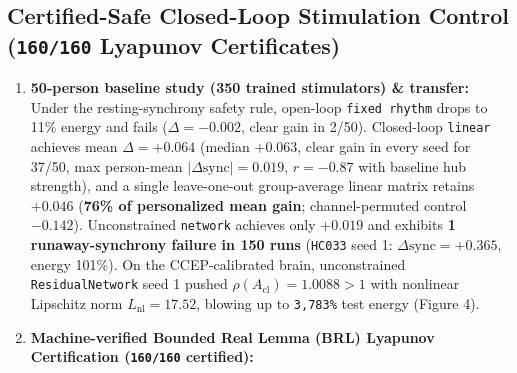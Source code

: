 \documentclass[11pt,a4paper]{article}
\begin{document}
\subsection{Certified-Safe Closed-Loop Stimulation Control (\texttt{160/160} Lyapunov Certificates)}
\begin{enumerate}
\item \textbf{50-person baseline study (350 trained stimulators) \& transfer:} Under the resting-synchrony safety rule, open-loop \texttt{fixed rhythm} drops to 11\% energy and fails ($\Delta = -0.002$, clear gain in 2/50). Closed-loop \texttt{linear} achieves mean $\Delta = +0.064$ (median $+0.063$, clear gain in every seed for 37/50, max person-mean $|\Delta\text{sync}| = 0.019$, $r = -0.87$ with baseline hub strength), and a single leave-one-out group-average linear matrix retains $+0.046$ (\textbf{76\% of personalized mean gain}; channel-permuted control $-0.142$). Unconstrained \texttt{network} achieves only $+0.019$ and exhibits \textbf{1 runaway-synchrony failure in 150 runs} (\texttt{HC033} seed 1: $\Delta\text{sync} = +0.365$, energy 101\%). On the CCEP-calibrated brain, unconstrained \texttt{ResidualNetwork} seed 1 pushed $\rho(A_{\text{cl}}) = 1.0088 > 1$ with nonlinear Lipschitz norm $L_{\text{nl}} = 17.52$, blowing up to \texttt{3,783\%} test energy (Figure 4).
\item \textbf{Machine-verified Bounded Real Lemma (BRL) Lyapunov Certification (\texttt{160/160} certified):}
\end{enumerate}
\end{document}
